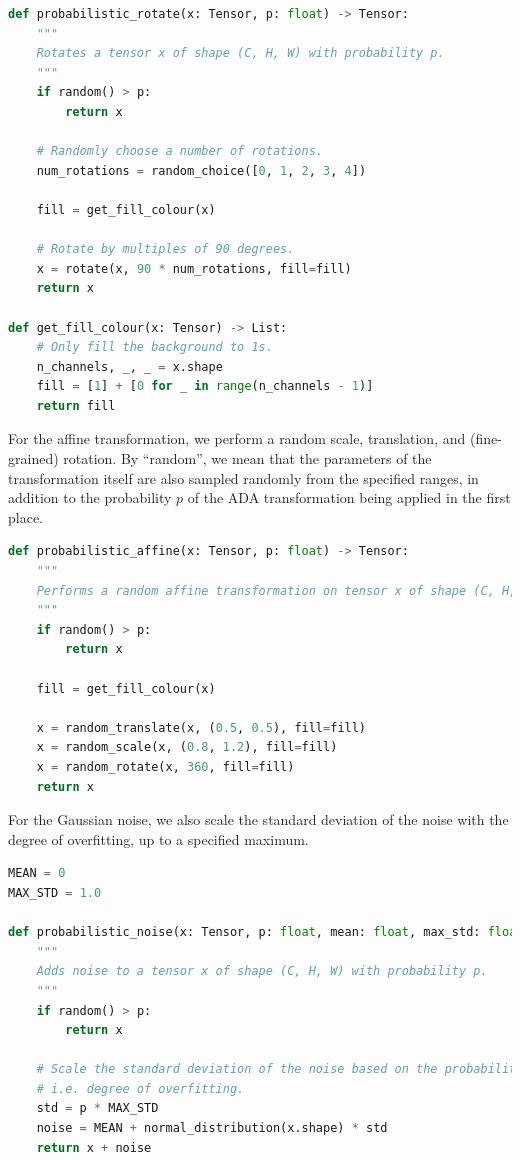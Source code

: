 \begin{lstlisting}[language=Python, caption=Python-like pseudocode for probabilistic rotation.]
def probabilistic_rotate(x: Tensor, p: float) -> Tensor:
    """
    Rotates a tensor x of shape (C, H, W) with probability p.
    """
    if random() > p:
        return x
        
    # Randomly choose a number of rotations.
    num_rotations = random_choice([0, 1, 2, 3, 4])
    
    fill = get_fill_colour(x)
    
    # Rotate by multiples of 90 degrees.
    x = rotate(x, 90 * num_rotations, fill=fill)
    return x
    
def get_fill_colour(x: Tensor) -> List:
    # Only fill the background to 1s.
    n_channels, _, _ = x.shape
    fill = [1] + [0 for _ in range(n_channels - 1)]
    return fill 
\end{lstlisting}
For the affine transformation, we perform a random scale, translation, and (fine-grained) rotation.
By ``random'', we mean that the parameters of the transformation itself are also sampled randomly from the specified ranges, in addition to the probability $p$ of the ADA transformation being applied in the first place.
\begin{lstlisting}[language=Python, caption=Python-like pseudocode for probabilistic affine rotation.]
def probabilistic_affine(x: Tensor, p: float) -> Tensor:
    """
    Performs a random affine transformation on tensor x of shape (C, H, W) with probability p.
    """
    if random() > p:
        return x
        
    fill = get_fill_colour(x)

    x = random_translate(x, (0.5, 0.5), fill=fill)
    x = random_scale(x, (0.8, 1.2), fill=fill)
    x = random_rotate(x, 360, fill=fill)
    return x
\end{lstlisting}
For the Gaussian noise, we also scale the standard deviation of the noise with the degree of overfitting, up to a specified maximum.
\begin{lstlisting}[language=Python, caption=Python-like pseudocode for probabilistic Gaussian noise.]
MEAN = 0
MAX_STD = 1.0

def probabilistic_noise(x: Tensor, p: float, mean: float, max_std: float) -> Tensor:
    """
    Adds noise to a tensor x of shape (C, H, W) with probability p.
    """
    if random() > p:
        return x

    # Scale the standard deviation of the noise based on the probability
    # i.e. degree of overfitting.
    std = p * MAX_STD
    noise = MEAN + normal_distribution(x.shape) * std
    return x + noise
\end{lstlisting}

